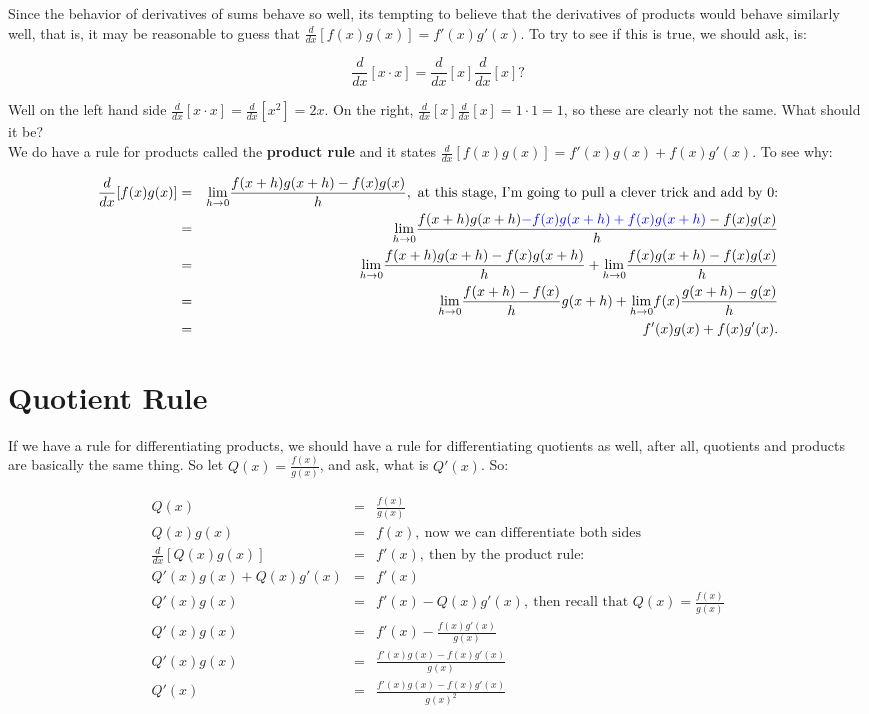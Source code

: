 Since the behavior of derivatives of sums behave so well, its tempting to believe that the derivatives of products would behave similarly well, that is, it may be reasonable to guess that $\frac{d}{dx}[f(x)g(x)]=f'(x)g'(x)$.  To try to see if this is true, we should ask, is:

$$\frac{d}{dx}[x\cdot x]=\frac{d}{dx}[x]\frac{d}{dx}[x]?$$

Well on the left hand side $\frac{d}{dx}[x\cdot x]=\frac{d}{dx}[x^2]=2x$.  On the right, $\frac{d}{dx}[x]\frac{d}{dx}[x]=1\cdot1=1$, so these are clearly not the same.  What should it be?\\

We do have a rule for products called the \textbf{ product rule} and it states $\frac{d}{dx}[f(x)g(x)]=f'(x)g(x)+f(x)g'(x).$  To see why:

\begin{eqnarray*}
\frac{d}{dx}[f(x)g(x)]&=&\limit{h}{0}\frac{f(x+h)g(x+h)-f(x)g(x)}{h},\ \text{at this stage, I'm going to pull a clever trick and add by 0:}\\
&=&\limit{h}{0}\frac{f(x+h)g(x+h)\textcolor{blue}{-f(x)g(x+h)+f(x)g(x+h)}-f(x)g(x)}{h}\\
&=&\limit{h}{0}\frac{f(x+h)g(x+h)-f(x)g(x+h)}{h}+\limit{h}{0}\frac{f(x)g(x+h)-f(x)g(x)}{h}\\
&=&\limit{h}{0}\frac{f(x+h)-f(x)}{h}g(x+h)+\limit{h}{0}f(x)\frac{g(x+h)-g(x)}{h}\\
&=&f'(x)g(x)+f(x)g'(x).
\end{eqnarray*}



\section{Quotient Rule}\label{Section:QuotientRule}

If we have a rule for differentiating products, we should have a rule for differentiating quotients as well, after all, quotients and products are basically the same thing.  So let $Q(x)=\frac{f(x)}{g(x)}$, and ask, what is $Q'(x)$.  So:

\begin{eqnarray*}
Q(x)&=&\frac{f(x)}{g(x)}\\
Q(x)g(x)&=&f(x),\ \text{now we can differentiate both sides}\\
\frac{d}{dx}[Q(x)g(x)]&=&f'(x),\ \text{then by the product rule:}\\
Q'(x)g(x)+Q(x)g'(x)&=&f'(x)\\
Q'(x)g(x)&=&f'(x)-Q(x)g'(x),\ \text{then recall that  $Q(x)=\frac{f(x)}{g(x)}$}\\
Q'(x)g(x)&=&f'(x)-\frac{f(x)g'(x)}{g(x)}\\
Q'(x)g(x)&=&\frac{f'(x)g(x)-f(x)g'(x)}{g(x)}\\
Q'(x)&=&\frac{f'(x)g(x)-f(x)g'(x)}{g(x)^2}\\
\end{eqnarray*}


